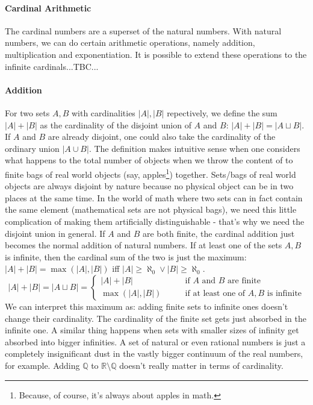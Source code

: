 \paragraph{Cardinal Arithmetic}
The cardinal numbers are a superset of the natural numbers. With natural numbers, we can do certain arithmetic operations, namely addition, multiplication and exponentiation. It is possible to extend these operations to the infinite cardinals...TBC...



\paragraph{Addition} For two sets $A,B$ with cardinalities $|A|,|B|$ repectively, we define the sum $|A| + |B|$ as the cardinality of the disjoint union of $A$ and $B$: $|A| + |B| = |A \sqcup B|$. If $A$ and $B$ are already disjoint, one could also take the cardinality of the ordinary union $|A \cup B|$. The definition makes intuitive sense when one considers what happens to the total number of objects when we throw the content of to finite bags of real world objects (say, apples\footnote{Because, of course, it's always about apples in math.}) together. Sets/bags of real world objects are always disjoint by nature because no physical object can be in two places at the same time. In the world of math where two sets can in fact contain the same element (mathematical sets are not physical bags), we need this little complication of making them artificially distinguishable - that's why we need the disjoint union in general. If $A$ and $B$ are both finite, the cardinal addition just becomes the normal addition of natural numbers. If at least one of the sets $A, B$ is infinite, then the cardinal sum of the two is just the maximum: $|A| + |B| = \max(|A|, |B|)$ iff $|A| \geq \aleph_0 \vee |B| \geq \aleph_0$.
\begin{equation}
|A| + |B| = |A \sqcup B| =
\begin{cases}
|A| + |B|       \qquad &\text{if $A$ and $B$ are finite} \\
\max(|A|,|B|)   \qquad &\text{if at least one of $A, B$ is infinite}
\end{cases}
\end{equation}
We can interpret this maximum as: adding finite sets to infinite ones doesn't change their cardinality. The cardinality of the finite set gets just absorbed in the infinite one. A similar thing happens when sets with smaller sizes of infinity get absorbed into bigger infinities. A set of natural or even rational numbers is just a completely insignificant dust in the vastly bigger continuum of the real numbers, for example. Adding $\mathbb{Q}$ to $\mathbb{R} \setminus \mathbb{Q}$ doesn't really matter in terms of cardinality.

